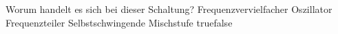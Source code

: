     {Worum handelt es sich bei dieser Schaltung?}
    {Frequenzvervielfacher}
    {Oszillator}
    {Frequenzteiler}
    {Selbstschwingende Mischstufe}
    {true}{false}